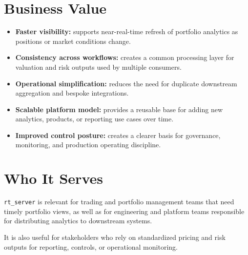 \documentclass[10pt]{article}
\begin{document}
\begin{minipage}[t]{0.48\textwidth}
	\section*{\textcolor{brandblue}{Business Value}}
	\begin{itemize}
		\item \textbf{Faster visibility:} supports near-real-time refresh of portfolio analytics as positions or market conditions change.
		\item \textbf{Consistency across workflows:} creates a common processing layer for valuation and risk outputs used by multiple consumers.
		\item \textbf{Operational simplification:} reduces the need for duplicate downstream aggregation and bespoke integrations.
		\item \textbf{Scalable platform model:} provides a reusable base for adding new analytics, products, or reporting use cases over time.
		\item \textbf{Improved control posture:} creates a clearer basis for governance, monitoring, and production operating discipline.
	\end{itemize}
\end{minipage}
\hfill
\begin{minipage}[t]{0.48\textwidth}
	\section*{\textcolor{brandblue}{Who It Serves}}
	\texttt{rt\_server} is relevant for trading and portfolio management teams that need timely portfolio views, as well as for engineering and platform teams responsible for distributing analytics to downstream systems.

	\vspace{0.8em}

	It is also useful for stakeholders who rely on standardized pricing and risk outputs for reporting, controls, or operational monitoring.
\end{minipage}

\vspace{1.8em}
\end{document}
